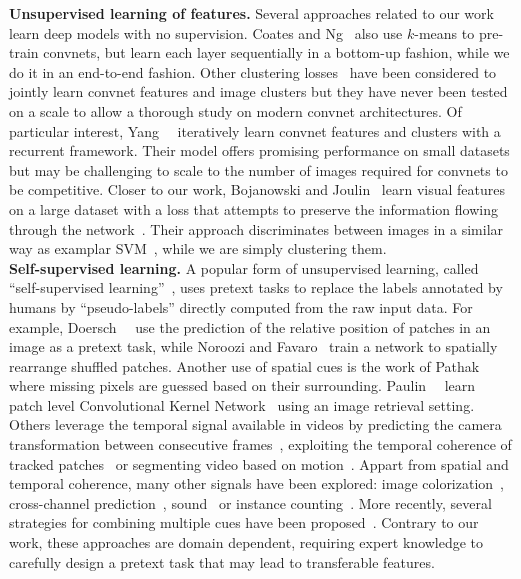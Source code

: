 

\noindent\textbf{Unsupervised learning of features.}
Several approaches related to our work learn deep models with no supervision.
Coates and Ng~\cite{coates2012learning} also use $k$-means to pre-train convnets, but learn each layer sequentially
in a bottom-up fashion, while we do it in an end-to-end fashion.
Other clustering losses~\cite{yang2016joint,xie2016unsupervised,dosovitskiy2014discriminative,liao2016learning} 
have been considered to jointly learn 
convnet features and image clusters but they have never been tested on a scale to allow a thorough study on modern convnet architectures.
Of particular interest,
Yang~\etal~\cite{yang2016joint} iteratively learn convnet features and clusters with a recurrent framework.
Their model offers promising performance on small datasets but may be 
challenging to scale to the number of images required for convnets to be competitive.
Closer to our work, Bojanowski and Joulin~\cite{bojanowski2017unsupervised} learn visual features on a large dataset with
a loss that attempts to preserve the information flowing through the network~\cite{linsker1988towards}. 
Their approach discriminates between images in a similar way as examplar SVM~\cite{malisiewicz2011ensemble}, while we are simply clustering them.
\\

\noindent\textbf{Self-supervised learning.}
A popular form of unsupervised learning, called ``self-supervised learning''~\cite{de1994learning},
uses pretext tasks to replace the labels annotated by humans by ``pseudo-labels'' directly computed from the raw input data.
For example,
Doersch~\etal~\cite{doersch2015unsupervised} use the prediction of the relative position of patches in an image as a pretext task,
while Noroozi and Favaro~\cite{noroozi2016unsupervised} train a network to spatially rearrange shuffled patches.
Another use of spatial cues is the work of Pathak~\etal~\cite{pathak2016context} where missing pixels are guessed based
on their surrounding.
Paulin~\etal~\cite{paulin2015local} learn patch level Convolutional Kernel Network~\cite{mairal2014convolutional} using an image retrieval setting. 
Others leverage the temporal signal available in videos by 
predicting the camera transformation between consecutive frames~\cite{agrawal2015learning}, exploiting the temporal coherence of tracked patches~\cite{wang2015unsupervised} or segmenting video based on motion~\cite{pathak2016learning}. 
Appart from spatial and temporal coherence, many other signals have been explored: image colorization~\cite{zhang2016colorful,larsson2016learning}, cross-channel prediction~\cite{zhang2016split}, sound~\cite{owens2016ambient} or instance counting~\cite{noroozi2017representation}.
More recently, several strategies for combining multiple cues have been proposed~\cite{wang2017transitive,doersch2017multi}.
Contrary to our work, these approaches are domain dependent, requiring expert knowledge 
to carefully design a pretext task that may lead to transferable features.
\\

